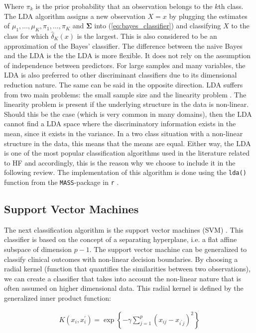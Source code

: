 \documentclass[../thesis.tex]{subfiles}
\begin{document}
\noindent Where $\pi_k$ is the prior probability that an observation belongs to the $k$th class. The LDA algorithm assigns a new observation $X=x$ by plugging the estimates of $\mu_1, \hdots, \mu_K, \pi_1, \hdots, \pi_K$ and $\boldsymbol{\Sigma}$ into (\ref{eq:bayes_classifier}) and classifying $X$ to the class for which $\hat{\delta}_K (x)$ is the largest. This is also considered to be an approximation of the Bayes' classifier. The difference between the naive Bayes and the LDA is the the LDA is more flexible. It does not rely on the assumption of independence between predictors. For large samples and many variables, the LDA is also preferred to other discriminant classifiers due to its dimensional reduction nature. The same can be said in the opposite direction. LDA suffers from two main problems: the small sample size and the linearity problem \citep{tharwat2017linear}. The linearity problem is present if the underlying structure in the data is non-linear. Should this be the case (which is very common in many domains), then the LDA cannot find a LDA space where the discriminatory information exists in the mean, since it exists in the variance. In a two class situation with a non-linear structure in the data, this means that the means are equal. Either way, the LDA is one of the most popular classification algorithms used in the literature related to HF and accordingly, this is the reason why we choose to include it in the following review. The implementation of this algorithm is done using the \texttt{lda()} function from the \texttt{MASS}-package in \texttt{r} \citep{MASS}.

\subsection{Support Vector Machines}
\label{subsec:svm}

\noindent The next classification algorithm is the support vector machines (SVM) \citep{vapnik1963pattern}. This classifier is based on the concept of a separating hyperplane, i.e. a flat affine subspace of dimension $p-1$. The support vector machine can be generalized to classify clinical outcomes with non-linear decision boundaries. By choosing a radial kernel (function that quantifies the similarities between two observations), we can create a classifier that takes into account the non-linear nature that is often assumed on higher dimensional data. This radial kernel is defined by the generalized inner product function: 

\begin{align}
    K(x_i, x_i^\prime) = \exp{\left\{-\gamma \sum_{j=1}^p\left(x_{ij} - x_{i^\prime j} \right)^2\right\}}
\end{align}
\end{document}
